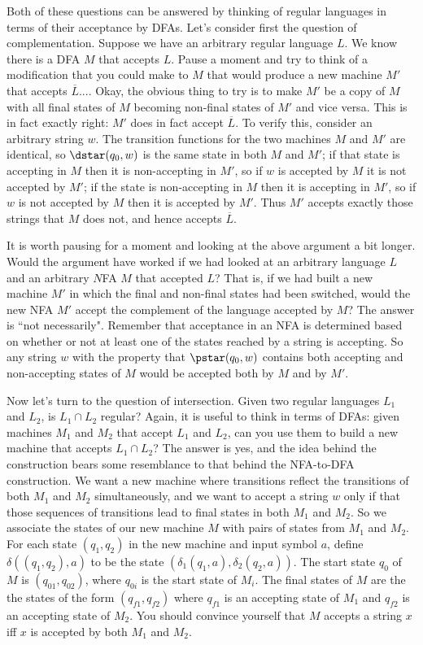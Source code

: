 Both of these questions can be answered by thinking of regular
languages in terms of their acceptance by DFAs.  Let's consider
first the question of complementation.  Suppose we have an arbitrary
regular language $L$.  We know there is a DFA $M$ that accepts $L$.
Pause a moment and try to think of a modification that you could make
to $M$ that would produce a new machine $M'$ that accepts $\overline{L}$....
Okay, the obvious thing to try is to make $M'$ be a copy of $M$ 
with all final states of $M$ becoming non-final states of $M'$ and
vice versa.  This is in fact exactly right: $M'$ does in fact accept
$\overline{L}$.  To verify this, consider an arbitrary string $w$.  The
transition functions for the two machines $M$ and $M'$ are identical, so $\dstar
(q_0, w)$ is the same state in both $M$ and $M'$; if that state is
accepting in $M$ then it is non-accepting in $M'$, so if $w$ is
accepted by $M$ it is not accepted by $M'$; if the state is
non-accepting in $M$ then it is accepting in $M'$, so if $w$ is
not accepted by $M$ then it is accepted by $M'$. Thus $M'$ accepts
exactly those strings that $M$ does not, and hence accepts $\overline{L}$.  

It is worth pausing for a moment and looking at the above argument
a bit longer.  Would the argument have worked if we had looked at an
arbitrary language $L$ and an arbitrary $N$FA $M$ that accepted $L$?
That is, if we had built a new machine $M'$ in which the final and
non-final states had been switched, would the new NFA $M'$ accept
the complement of the language accepted by $M$?  The answer is
``not necessarily".  Remember that acceptance in an NFA is determined
based on whether or not at least one of the states reached by a
string is accepting.  So any string $w$ with the property that
$\pstar(q_0, w)$ contains both accepting and non-accepting states of $M$
would be accepted both by $M$ and by $M'$.

Now let's turn to the question of intersection.  Given two regular
languages $L_1$ and $L_2$, is $L_1 \cap L_2$ regular?  Again, it is
useful to think in terms of DFAs: given machines $M_1$ and $M_2$
that accept $L_1$ and $L_2$, can you use them to build a new
machine that accepts $L_1 \cap L_2$? The answer is yes, and the
idea behind the construction bears some resemblance to that behind
the NFA-to-DFA construction.  
We want a new machine where transitions reflect the transitions
of both $M_1$ and $M_2$ simultaneously, and we want to accept a
string $w$ only if that those sequences of transitions lead to 
final states in both $M_1$ and $M_2$. So we associate the
states of our new machine $M$ with pairs of states from $M_1$
and $M_2$.  For each state $(q_1,q_2)$ in the new machine and input symbol $a$,
define $\delta((q_1,q_2),a)$ to be the state 
$(\delta_1(q_1,a), \delta_2(q_2,a))$.
The start state $q_0$ of $M$ is
$(q_{01}, q_{02})$, where $q_{0i}$ is the start state
of $M_i$.  The final states of $M$ are the the states of the form $(q_{f1},
q_{f2})$ where $q_{f1}$ is an accepting state of $M_1$ and $q_{f2}$ is an
accepting state of $M_2$.  You should convince yourself that $M$ accepts a
string $x$ iff $x$ is accepted by both $M_1$ and $M_2$.

